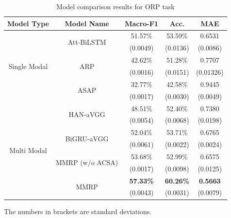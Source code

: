 \documentclass[preprint,12pt]{elsarticle}
\begin{document}
\begin{table}[htp]
	\centering
	\caption{Model comparison results for ORP task}
	\begin{tabular}{ccccc}
		\toprule[1.5pt]
		Model Type          & Model Name                           & Macro-F1 & Acc. & MAE      \\ \hline
		\multirow{6}{*}{Single Modal} & \multirow{2}{*}{Att-BiLSTM}                 & 51.57\%             & 53.59\%         & 0.6531    \\
		&                                         & (0.0049)          & (0.0136)      & (0.0086) \\
		& \multirow{2}{*}{ARP}                    & 42.62\%             & 51.28\%         & 0.7707    \\
		&                                         & (0.0016)          & (0.0151)      & (0.01326) \\
		& \multirow{2}{*}{ASAP}                   & 32.77\%             & 42.58\%         & 0.9445    \\
		&                                         & (0.0017)          & (0.0030)      & (0.0049) \\ \hline
		\multirow{8}{*}{Multi Modal} & \multirow{2}{*}{HAN-aVGG}                    & 48.51\%             & 52.40\%         & 0.7380    \\
		&                                         & (0.0054)          & (0.0068)      & (0.0198) \\
		& \multirow{2}{*}{BiGRU-aVGG}                  & 52.04\%             & 53.71\%         & 0.6765    \\
		&                                         & (0.0061)          & (0.0022)      & (0.0024) \\
		& \multirow{2}{*}{MMRP (w/o ACSA)} & 53.68\%             & 52.99\%         & 0.6575    \\
		&                                         & (0.0017)          & (0.0098)      & (0.0125) \\
		& \multirow{2}{*}{MMRP}            & \textbf{57.33\%}             & \textbf{60.26\%}         & \textbf{0.5663}    \\
		&                                         & (0.0043)          & (0.0031)      & (0.0079) \\ \bottomrule[1.5pt]
	\end{tabular}

        \begin{tablenotes} %
			\footnotesize
			\item The numbers in brackets are standard deviations. 
		\end{tablenotes}

    
	\label{table:rp_result}
\end{table}
\end{document}

